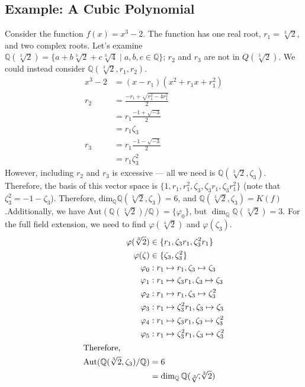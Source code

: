 \documentclass[8pt]{extarticle}
\newcommand{\Q}{\mathbb{Q}}
\begin{document}
  \subsection{Example: A Cubic Polynomial}%
  Consider the function $f(x) = x^3 - 2$. The function has one real root, $r_1=\sqrt[3]{2}$, and two complex roots. Let's examine $\Q(\sqrt[3]{2}) = \{a + b\sqrt[3]{2} + c\sqrt[3]{4}\mid a,b,c\in\Q\}$; $r_2$ and $r_3$ are not in $Q(\sqrt[3]{2})$. We could instead consider $\Q(\sqrt[3]{2},r_1,r_2)$.
  \begin{align*}
    x^3-2 &= (x-r_1)(x^2 + r_1x + r_1^2)\\
    r_2 &= \frac{-r_1 + \sqrt{r_1^2-4r_1^2}}{2}\\
        &= r_1\frac{-1+\sqrt{-3}}{2}\\
        &= r_1\zeta_3\\
    r_3 &= r_1\frac{-1 - \sqrt{-3}}{2}\\
        &= r_1\zeta_3^2
  \end{align*}
  However, including $r_2$ and $r_3$ is excessive --- all we need is $\Q(\sqrt[3]{2},\zeta_3)$. Therefore, the basis of this vector space is $\{1,r_1,r_1^2,\zeta_3,\zeta_3 r_1,\zeta_3 r_1^2\}$ (note that $\zeta_3^2 = -1-\zeta_3$). Therefore, $\text{dim}_{\Q}\Q(\sqrt[3]{2},\zeta_3)=6$, and $\Q(\sqrt[3]{2},\zeta_3) = K(f)$.Additionally, we have $\text{Aut}(\Q(\sqrt[3]{2})/\Q) = \{\varphi_0\}$, but $\dim_{\Q}\Q(\sqrt[3]{2}) = 3$. For the full field extension, we need to find $\varphi(\sqrt[3]{2})$ and $\varphi(\zeta_3)$.
  \begin{align*}
    \varphi(\sqrt[3]{2}) &\in \{r_1,\zeta_3 r_1,\zeta_3^2 r_1\}\\
    \varphi(\zeta) &\in \{\zeta_3,\zeta_3^2\}\\
    \varphi_0 &: r_1\mapsto r_1,\zeta_3\mapsto \zeta_3\\
    \varphi_1 &: r_1\mapsto \zeta_3r_1,\zeta_3\mapsto \zeta_3\\
    \varphi_2 &: r_1\mapsto r_1,\zeta_3\mapsto \zeta_3^2\\
    \varphi_3 &: r_1\mapsto \zeta_3^2r_1,\zeta_3\mapsto \zeta_3\\
    \varphi_4 &: r_1\mapsto \zeta_3r_1,\zeta_3\mapsto \zeta_3^2\\
    \varphi_5 &: r_1\mapsto \zeta_3^2r_1,\zeta_3\mapsto \zeta_3^2\\
    \shortintertext{Therefore,}
    \text{Aut}(\Q(\sqrt[3]{2},\zeta_3)/\Q) &= 6\\
                                           &= \dim_{\Q}\Q(\sqrt[3],\sqrt[3]{2})
  \end{align*}
\end{document}

